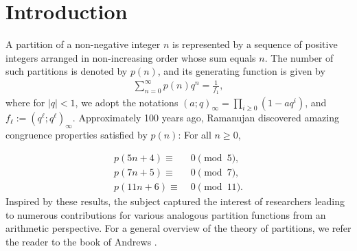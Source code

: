 \documentclass[a4paper,12pt,reqno]{amsart}
\numberwithin{equation}{section}
\begin{document}
\bigskip 


	\section {Introduction}

A partition of a non-negative integer $n$ is represented by a sequence of positive integers arranged in non-increasing order whose sum equals $n$. The number of such partitions is denoted by $p(n)$, and its generating function is given by
	 \begin{align*}
	 	\sum_{n=0}^{\infty}p(n)q^n=\frac{1}{f_1},
	\end{align*}
	 where for $|q|<1$, we adopt the notations $(a;q)_\infty=\prod_{i\geq0}^{}(1-aq^i)$, and $f_\ell:=(q^\ell;q^\ell)_\infty$.
	Approximately 100 years ago,  Ramanujan \cite{r12, r13, r14} discovered amazing congruence properties satisfied by $p(n)$: 
	For all $n \geq 0$,

\begin{align}
	p(5n+4) \equiv& \;0 \pmod{5},\label{R1}\\
	p(7n+5) \equiv&\; 0 \pmod{7},\label{R2}\\
	p(11n+6) \equiv&\; 0 \pmod{11} \label{R3}.
\end{align}
	 Inspired by these results, the subject captured the interest of researchers leading to numerous contributions for various analogous partition functions from an arithmetic perspective. For a general overview of the theory of partitions, we refer the reader to the book of Andrews \cite{r2}.
\end{document}
